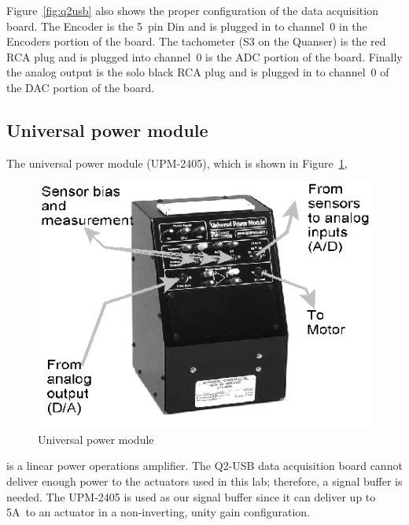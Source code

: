 Figure~\ref{fig:q2usb} also shows the proper configuration of the data
acquisition board.  The Encoder is the 5~pin Din and is plugged in to
channel~0 in the Encoders portion of the board. The tachometer (S3 on the
Quanser) is the red RCA plug and is plugged into channel~0 is the ADC
portion of the board.  Finally the analog output is the solo black RCA plug
and is plugged in to channel~0 of the DAC portion of the board.

\subsection{Universal power module}

The universal power module (UPM-2405), which is shown in
Figure~\ref{fig:power}\@,
\begin{figure}[htbp]
    \centering
    \includegraphics[width=0.6\hsize]{pix/power.jpg}
    \caption{Universal power module}\label{fig:power}
\end{figure}%
is a linear power operations amplifier. The Q2-USB data acquisition board
cannot deliver enough power to the actuators used in this lab; therefore, a
signal buffer is needed.  The UPM-2405 is used as our signal buffer since it
can deliver up to 5A~to an actuator in a non-inverting, unity gain
configuration.

